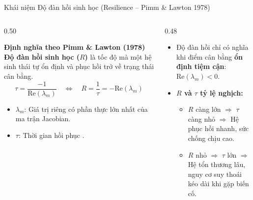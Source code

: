 \documentclass[aspectratio=169, 10pt]{beamer}
\renewcommand{\implies}{\ensuremath{\Rightarrow}}
\renewcommand{\Longleftrightarrow}{\Leftrightarrow}
\begin{document}
\begin{frame}{Khái niệm Độ đàn hồi sinh học (Resilience -- Pimm \& Lawton 1978)}
  \begin{columns}[t]
    \begin{column}{0.50\textwidth}
      \begin{block}{\textbf{Định nghĩa theo Pimm \& Lawton (1978)}}
        \footnotesize
        \textbf{Độ đàn hồi sinh học ($R$)} là tốc độ mà một hệ sinh thái tự ổn định và phục hồi trở về trạng thái cân bằng.
        \begin{equation}
        \tau = \frac{-1}{\mathrm{Re}(\lambda_m)} \quad \Longleftrightarrow \quad R = \frac{1}{\tau} = -\mathrm{Re}(\lambda_m)
        \end{equation}
        \begin{itemize}
          \item $\lambda_m$: Giá trị riêng có phần thực lớn nhất của ma trận Jacobian.
          \item $\tau$: Thời gian hồi phục .
        \end{itemize}
      \end{block}
    \end{column}

    \begin{column}{0.48\textwidth}
      \begin{tcolorbox}[colback=OceanLight, colframe=OceanNavy, arc=2mm, title=\textbf{Ý nghĩa cơ chế động lực học}]
        \footnotesize
        \begin{itemize}
          \item Độ đàn hồi chỉ có nghĩa khi điểm cân bằng \textbf{ổn định tiệm cận}: $\mathrm{Re}(\lambda_m) < 0$.
          \item \textbf{$R$ và $\tau$ tỷ lệ nghịch:}
          \begin{itemize}
            \item $R$ càng lớn $\implies$ $\tau$ càng nhỏ $\implies$ Hệ phục hồi nhanh, sức chống chịu cao.
            \item $R$ nhỏ $\implies$ $\tau$ lớn $\implies$ Hệ tổn thương lâu, nguy cơ suy thoái kéo dài khi gặp biến cố.
          \end{itemize}
        \end{itemize}
      \end{tcolorbox}
    \end{column}
  \end{columns}
\end{frame}
\end{document}
